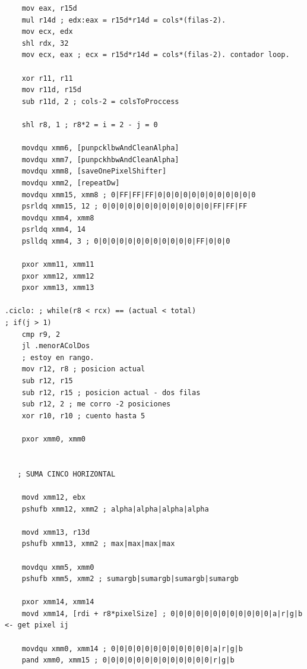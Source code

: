 \begin{codesnippet}
\begin{verbatim}
	mov eax, r15d
	mul r14d ; edx:eax = r15d*r14d = cols*(filas-2).
	mov ecx, edx
	shl rdx, 32
	mov ecx, eax ; ecx = r15d*r14d = cols*(filas-2). contador loop.

	xor r11, r11
	mov r11d, r15d
	sub r11d, 2 ; cols-2 = colsToProccess

	shl r8, 1 ; r8*2 = i = 2 - j = 0

	movdqu xmm6, [punpcklbwAndCleanAlpha]
	movdqu xmm7, [punpckhbwAndCleanAlpha]
	movdqu xmm8, [saveOnePixelShifter]
	movdqu xmm2, [repeatDw]
	movdqu xmm15, xmm8 ; 0|FF|FF|FF|0|0|0|0|0|0|0|0|0|0|0|0
    psrldq xmm15, 12 ; 0|0|0|0|0|0|0|0|0|0|0|0|0|FF|FF|FF
    movdqu xmm4, xmm8
    psrldq xmm4, 14
    pslldq xmm4, 3 ; 0|0|0|0|0|0|0|0|0|0|0|0|FF|0|0|0

	pxor xmm11, xmm11
	pxor xmm12, xmm12
	pxor xmm13, xmm13

.ciclo: ; while(r8 < rcx) == (actual < total) 
; if(j > 1)
	cmp r9, 2
	jl .menorAColDos
	; estoy en rango.
	mov r12, r8 ; posicion actual
	sub r12, r15
	sub r12, r15 ; posicion actual - dos filas
	sub r12, 2 ; me corro -2 posiciones
	xor r10, r10 ; cuento hasta 5

	pxor xmm0, xmm0
  
    
   ; SUMA CINCO HORIZONTAL    
    
	movd xmm12, ebx
	pshufb xmm12, xmm2 ; alpha|alpha|alpha|alpha

	movd xmm13, r13d
	pshufb xmm13, xmm2 ; max|max|max|max

	movdqu xmm5, xmm0
	pshufb xmm5, xmm2 ; sumargb|sumargb|sumargb|sumargb 

	pxor xmm14, xmm14
	movd xmm14, [rdi + r8*pixelSize] ; 0|0|0|0|0|0|0|0|0|0|0|0|a|r|g|b <- get pixel ij

	movdqu xmm0, xmm14 ; 0|0|0|0|0|0|0|0|0|0|0|0|a|r|g|b
	pand xmm0, xmm15 ; 0|0|0|0|0|0|0|0|0|0|0|0|0|r|g|b
\end{verbatim}
\end{codesnippet}

